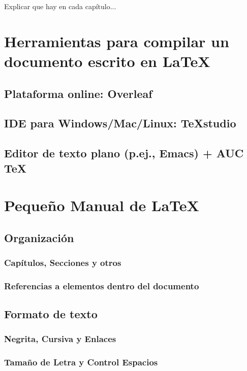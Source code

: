 \documentclass[twoside]{urjc-tfg}
\begin{document}
Explicar que hay en cada capítulo...


\chapter{Herramientas para compilar un documento escrito en \LaTeX}
\label{cap:tools}

\section{Plataforma online: Overleaf}

\section{IDE para Windows/Mac/Linux: TeXstudio}

\section{Editor de texto plano (p.ej., Emacs) + AUC \TeX}



\chapter{Pequeño Manual de \LaTeX}

\section{Organización}

\subsection{Capítulos, Secciones y otros}

\subsection{Referencias a elementos dentro del documento}

\section{Formato de texto}

\subsection{Negrita, Cursiva y Enlaces}

\subsection{Tamaño de Letra y Control Espacios}
\end{document}
